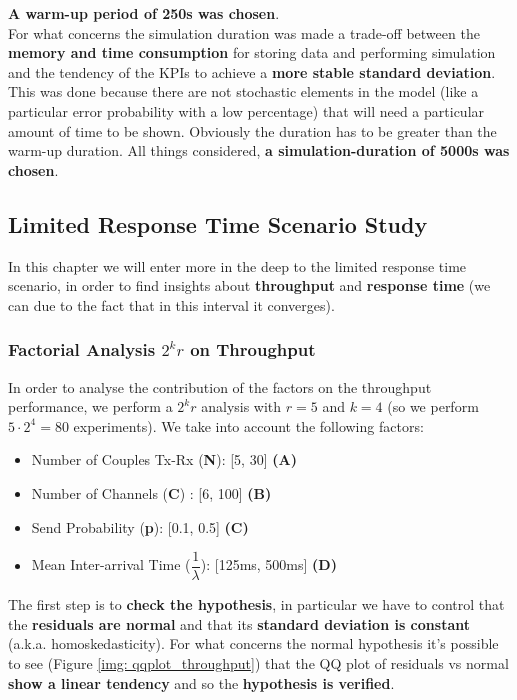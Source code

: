 \noindent\textbf{A warm-up period of 250s was chosen}.\\
For what concerns the simulation duration was made a trade-off between the \textbf{memory and time consumption} for storing data and performing simulation and the tendency of the KPIs to achieve a \textbf{more stable standard deviation}. This was done because there are not stochastic elements in the model (like a particular error probability with a low percentage) that will need a particular amount of time to be shown. Obviously the duration has to be greater than the warm-up duration. All things considered, \textbf{a simulation-duration of 5000s was chosen}.

\subsection{Limited Response Time Scenario Study}
In this chapter we will enter more in the deep to the limited response time scenario, in order to find insights about \textbf{throughput} and \textbf{response time} (we can due to the fact that in this interval it converges).
\subsubsection{Factorial Analysis $2^kr$ on Throughput}
In order to analyse the contribution of the factors on the throughput performance, we perform a $2^kr$ analysis with $r=5$ and $k=4$ (so we perform $5\cdot2^4 = 80$ experiments). We take into account the following factors:
\begin{itemize}
	\item Number of Couples Tx-Rx (\textbf{N}): [5, 30] \textbf{(A)}
	\item Number of Channels (\textbf{C}) : [6, 100] \textbf{(B)}
	\item Send Probability (\textbf{p}): [0.1, 0.5] \textbf{(C)}
	\item Mean Inter-arrival Time ($\dfrac{1}{\lambda}$): [125ms, 500ms] \textbf{(D)}    
\end{itemize}

\noindent The first step is to \textbf{check the hypothesis}, in particular we have to control that the \textbf{residuals are normal} and that its \textbf{standard deviation is constant} (a.k.a. homoskedasticity). For what concerns the normal hypothesis it's possible to see (Figure \ref{img: qqplot_throughput}) that the QQ plot of residuals vs normal \textbf{show a linear tendency} and so the \textbf{hypothesis is verified}.

